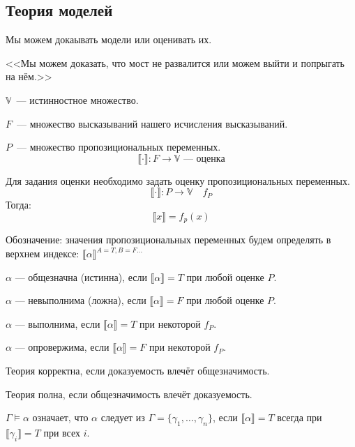 \subsection{Теория моделей}
Мы можем докаывать модели или оценивать их.

<<Мы можем доказать, что мост не развалится или можем выйти и попрыгать на нём.>>

\begin{definition}
    $\mathbb{V}$~--- истинностное множество.

    $F$~--- множество высказываний нашего исчисления высказываний.

    $P$~--- множество пропозициональных переменных.
    \[ \llbracket\cdot\rrbracket: F \to \mathbb{V} \text{~--- оценка}\]
\end{definition}

\begin{definition}
    Для задания оценки необходимо задать оценку пропозициональных переменных.
    \[\llbracket \cdot \rrbracket : P\to \mathbb{V} \quad f_P\]
    Тогда:
    \[ \llbracket x \rrbracket = f_p(x)\]
\end{definition}

\begin{remark}
    Обозначение: значения пропозициональных переменных будем определять в верхнем индексе: $\llbracket \alpha \rrbracket ^{A = T, B = F \ldots}$
\end{remark}


\begin{definition}
    $\alpha$ --- общезначна (истинна), если $\llbracket \alpha \rrbracket = T$ при любой оценке $P$.

    $\alpha$ --- невыполнима (ложна), если $\llbracket \alpha \rrbracket = F$ при любой оценке $P$.

    $\alpha$ --- выполнима, если $\llbracket \alpha \rrbracket = T$ при некоторой $f_P$.

    $\alpha$ --- опровержима, если $\llbracket \alpha \rrbracket = F$ при некоторой $f_P$.
\end{definition}

\begin{definition}
    Теория корректна, если доказуемость влечёт общезначимость.

    Теория полна, если общезначимость влечёт доказуемость.
\end{definition}

\begin{definition}
    $\Gamma \vDash \alpha$ означает, что $\alpha$ следует из $\Gamma = \{ \gamma_1, \ldots, \gamma_n\}$, если $\llbracket \alpha \rrbracket = T$ всегда при $\llbracket \gamma_i \rrbracket = T$ при всех $i$.
\end{definition}

